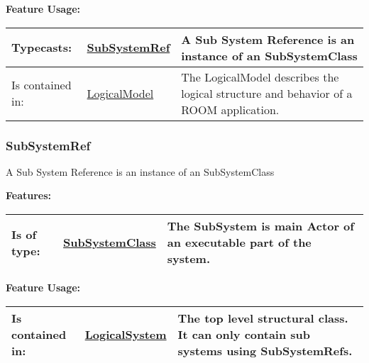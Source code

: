 		\begingroup
		\textbf{Feature Usage:}
		\renewcommand{\arraystretch}{1.8} %
		\begin{longtable}{l|l p{}}
			\hline
		Typecasts: & \tabitem \hyperlink{ref:SubSystemRef}{SubSystemRef}  & A Sub System Reference is an instance of an SubSystemClass\\
		\hline
		Is contained in: & \tabitem \hyperlink{ref:LogicalModel}{LogicalModel}  & The LogicalModel describes the logical structure and behavior of a ROOM application.\\
		\hline
		\end{longtable}
		\endgroup
		
		
	\vspace{\baselineskip}
	\vspace{\baselineskip}
	\vspace{\baselineskip}
	
	\subsubsection{SubSystemRef}
		\hypertarget{ref:SubSystemRef}{}
		
		A Sub System Reference is an instance of an SubSystemClass
		
		
		
		\begingroup
		\textbf{Features:}
		\renewcommand{\arraystretch}{1.8} %
		\begin{longtable}{l|l p{}}
			\hline
		Is of type: & \tabitem \hyperlink{ref:SubSystemClass}{SubSystemClass}  & The SubSystem is main Actor of an executable part of the system. \\
		\hline
		\end{longtable}
		\endgroup
		
		\begingroup
		\textbf{Feature Usage:}
		\renewcommand{\arraystretch}{1.8} %
		\begin{longtable}{l|l p{}}
			\hline
		Is contained in: & \tabitem \hyperlink{ref:LogicalSystem}{LogicalSystem}  & The top level structural class. It can only contain sub systems using SubSystemRefs.\\
		\hline
		\end{longtable}
		\endgroup
		
		
	\vspace{\baselineskip}
	\vspace{\baselineskip}
	\vspace{\baselineskip}
